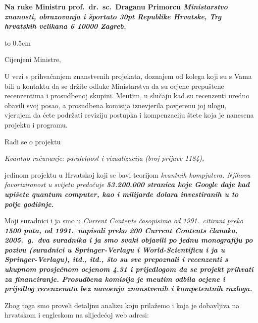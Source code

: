 
\address
\parindent=20pt
\bf Na ruke
Ministru prof.~dr.~sc.~Draganu Primorcu 
\smallskip
\it Ministarstvo znanosti, obrazovanja i \v sporta\break\hbox to 30pt{\hfill} Republike Hrvatske, 
\rm Trg hrvatskih velikana 6 
10000 Zagreb.

\endaddress

\vbox to 0.5cm{\vfill}


\parindent=0pt    


\bigskip\medskip
Cijenjeni Ministre, 

\medskip
U vezi s prihva\'canjem znanstvenih projekata, doznajem od 
kolega koji su s Vama bili u kontaktu da se dr\v zite odluke
Ministarstva da su ocjene prepu\v stene recenzentima i 
prosudbenoj skupini. Me\dj utim, u slu\v caju kad su 
recenzenti uredno obavili svoj posao, a prosudbena komisija 
iznevjerila povjerenu joj ulogu, vjerujem da \'cete 
podr\v zati reviziju postupka i kompenzaciju \v stete 
koja je nanesena projektu i programu. 

\parindent=20pt   
Radi se o projektu 

\it
\smallskip
\parindent=40pt   
Kvantno ra\v cunanje: paralelnost i vizualizacija (broj prijave 1184),

\rm
\smallskip
\parindent=0pt   
jedinom projektu u Hrvatskoj \rm koji se bavi teorijom 
\it kvantnih kompjutera\rm. Njihovu favoriziranost u svijetu 
predo\v cuje \bf 53.200.000 \rm stranica koje \it Google \rm daje kad 
upi\v sete \it quantum computer\rm, kao i \bf milijarde dolara 
\rm investiranih u to polje godi\v snje.


\parindent=20pt   
\smallskip 
Moji suradnici i ja smo u \it Current Contents\/ \rm \v casopisima 
od 1991.\ citirani preko \bf 1500 \rm puta, od 1991.\ napisali preko 
\bf 200 \it Current Contents\/ \rm \v clanaka, \bf 2005.~g.\ dva suradnika
i ja smo svaki objavili po jednu monografiju po pozivu (suradnici u 
\it Springer-Verlagu \bf i \it World-Scientificu\/ \bf i ja u 
\it Springer-Verlagu\bf)\rm, itd., itd., \v sto su sve prepoznali i 
recenzenti s \bf ukupnom prosje\v cnom ocjenom 4.31 i prijedlogom 
da se projekt prihvati za financiranje\rm. Prosudbena komisija je 
me\dj utim odbila ocjene i prijedlog recenzenata bez navo\dj enja 
znanstvenih i kompetentnih razloga. 

\smallskip 
Zbog toga smo proveli detaljnu analizu koju prila\v zemo i koja je 
dobavljiva na hrvatskom i engleskom na slijede\'coj web adresi:

